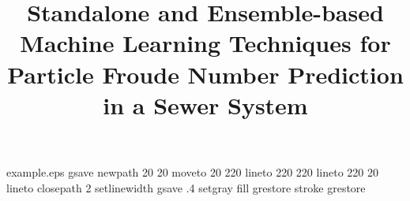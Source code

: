 %
%
%
%
%
\begin{filecontents*}{example.eps}
gsave
newpath
  20 20 moveto
  20 220 lineto
  220 220 lineto
  220 20 lineto
closepath
2 setlinewidth
gsave
  .4 setgray fill
grestore
stroke
grestore
\end{filecontents*}
%
\RequirePackage{fix-cm}
%
\documentclass[smallextended]{svjour3}       %
%
\smartqed  %
%
\usepackage{graphicx}
\usepackage{mathtools}  %
\usepackage{amsfonts}  %
\usepackage{amsmath}
\usepackage{amssymb}
\usepackage{subcaption}
\captionsetup{compatibility=false}
\usepackage[sort&compress,square,comma,authoryear]{natbib}
\usepackage{graphicx, caption, subcaption}

%
%
%
%


\title{Standalone and Ensemble-based Machine Learning Techniques for Particle Froude Number Prediction in a Sewer System%
}

